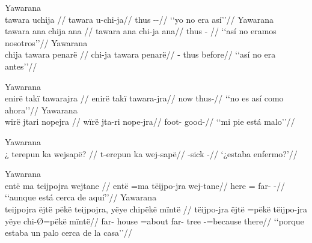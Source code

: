 \documentclass{memoir}
\begin{document}
\pex\label{temp-neg-advpred-cop-neg-nsubj}    \a Yawarana\\
    \label{descmensgrme-43}        \begingl
        \glpreamble tawara uchija //
        \gla tawara u-chi-ja//
        \glb thus --//
            \glft ‘‘yo no era así’’//  
        \endgl 
    \a Yawarana\\
    \label{histyarirdi-248}        \begingl
        \glpreamble tawara ana chija ana //
        \gla tawara ana chi-ja ana//
        \glb thus  - //
            \glft ‘‘así no eramos nosotros’’//  
        \endgl 
    \a Yawarana\\
    \label{histyarirdi-249}        \begingl
        \glpreamble chija tawara penarë //
        \gla chi-ja tawara penarë//
        \glb {}- thus before//
            \glft ‘‘así no era antes’’//  
        \endgl 
\xe

\pex\label{temp-neg-nsubj-advpred-jra}    \a Yawarana\\
    \label{convestsjm-34}        \begingl
        \glpreamble enirë takï tawarajra //
        \gla enirë takï tawara-jra//
        \glb now  thus-//
            \glft ‘‘no es así como ahora’’//  
        \endgl 
    \a Yawarana\\
    \label{histaccigrme-2}        \begingl
        \glpreamble wïrë jtari nopejra //
        \gla wïrë jta-ri nope-jra//
        \glb {} foot- good-//
            \glft ‘‘mi pie está malo’’//  
        \endgl 
\xe

\ex Yawarana \\
\label{temp-q-npred-cop}    \begingl
    \glpreamble ¿ terepun ka wejsapë? //
    \gla t-erepun ka wej-sapë//
    \glb {}-sick  -//
        \glft ‘¿estaba enfermo?’//  
    \endgl 
\xe

\pex\label{loc-aff-advpred-nsubj-cop}    \a Yawarana\\
    \label{convestsjm-35}        \begingl
        \glpreamble entë ma teijpojra wejtane //
        \gla entë =ma tëijpo-jra wej-tane//
        \glb here = far- -//
            \glft ‘‘aunque está cerca de aquí’’//  
        \endgl 
    \a Yawarana\\
    \label{convfemgrme-106}        \begingl
        \glpreamble teijpojra ëjtë pëkë teijpojra, yëye chipëkë mïntë //
        \gla tëijpo-jra ëjtë =pëkë tëijpo-jra yëye chi-Ø=pëkë mïntë//
        \glb far- house =about far- tree -=because there//
            \glft ‘‘porque estaba un palo cerca de la casa’’//  
        \endgl 
\xe
\end{document}

